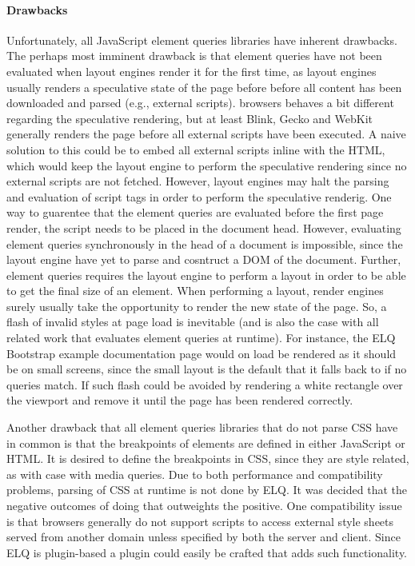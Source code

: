 \documentclass[a4paper,11pt]{kth-mag}
\begin{document}
    \paragraph{Drawbacks}
    Unfortunately, all \gls{JavaScript} element queries libraries have inherent drawbacks.
    The perhaps most imminent drawback is that element queries have not been evaluated when \glspl{layout engine} render it for the first time, as \glspl{layout engine} usually renders a speculative state of the page before before all content has been downloaded and parsed (e.g., external scripts).
    \Glspl{browser} behaves a bit different regarding the speculative rendering, but at least \gls{Blink}, \gls{Gecko} and \gls{WebKit} generally renders the page before all external scripts have been executed.
    A naive solution to this could be to embed all external scripts inline with the \gls{HTML}, which would keep the \gls{layout engine} to perform the speculative rendering since no external scripts are not fetched.
    However, \glspl{layout engine} may halt the parsing and evaluation of script tags in order to perform the speculative renderig.
    One way to guarentee that the element queries are evaluated before the first page render, the script needs to be placed in the \gls{document} head.
    However, evaluating element queries synchronously in the head of a \gls{document} is impossible, since the \gls{layout engine} have yet to parse and cosntruct a \gls{DOM} of the \gls{document}.
    Further, element queries requires the \gls{layout engine} to perform a layout in order to be able to get the final size of an \gls{element}.
    When performing a layout, render engines surely usually take the opportunity to render the new state of the page.
    So, a flash of invalid styles at page load is inevitable (and is also the case with all related work that evaluates element queries at runtime).
    For instance, the \gls{ELQ} \gls{Bootstrap} example documentation page would on load be rendered as it should be on small screens, since the small layout is the default that it falls back to if no queries match.
    If such flash could be avoided by rendering a white rectangle over the \gls{viewport} and remove it until the page has been rendered correctly.

    Another drawback that all element queries libraries that do not parse \gls{CSS} have in common is that the breakpoints of \glspl{element} are defined in either \gls{JavaScript} or \gls{HTML}.
    It is desired to define the breakpoints in \gls{CSS}, since they are style related, as with case with \gls{media queries}.
    Due to both performance and compatibility problems, parsing of \gls{CSS} at runtime is not done by \gls{ELQ}.
    It was decided that the negative outcomes of doing that outweights the positive.
    One compatibility issue is that \glspl{browser} generally do not support scripts to access external style sheets served from another domain unless specified by both the server and client.
    Since \gls{ELQ} is plugin-based a plugin could easily be crafted that adds such functionality.
\end{document}

